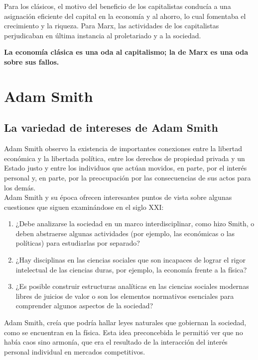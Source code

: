 \documentclass[10pt]{book}
\begin{document}
Para los clásicos, el motivo  del beneficio de los capitalistas conducía a una asignación eficiente del capital en la economía y al ahorro, lo cual fomentaba el crecimiento y la riqueza. Para Marx, las actividades de los capitalistas perjudicaban en última instancia al proletariado y a la sociedad.

\textbf{La economía clásica es una oda al capitalismo; la de Marx es una oda sobre sus fallos.}

\chapter{Adam Smith}

\section{La variedad de intereses de Adam Smith}
Adam Smith observo la existencia de importantes conexiones entre la libertad económica y la libertada política, entre los derechos de propiedad privada y un Estado justo y entre los individuos que actúan movidos, en parte, por el interés personal y, en parte, por la preocupación por las consecuencias de sus actos para los demás.\\

Adam Smith y su época ofrecen interesantes puntos de vista sobre algunas cuestiones que siguen examinándose en el siglo XXI: 
\begin{enumerate}[(1)]
    \item ¿Debe analizarse la sociedad en un marco interdisciplinar, como hizo Smith, o deben abstraerse algunas actividades (por ejemplo, las económicas o las políticas) para estudiarlas por separado? 
    \item ¿Hay disciplinas en las ciencias sociales que son incapaces de lograr el rigor intelectual de las ciencias duras, por ejemplo, la economía frente a la física? 
    \item ¿Es posible construir estructuras analíticas en las ciencias sociales modernas libres de juicios de valor o son los elementos normativos esenciales para comprender algunos aspectos de la sociedad?
\end{enumerate}

Adam Smith, creía que podría hallar leyes naturales que gobiernan la sociedad, como se encuentran en la física. Esta idea preconcebida le permitió ver que no había caos sino armonía, que era el resultado de la interacción del interés personal individual en mercados competitivos.\\
\end{document}
